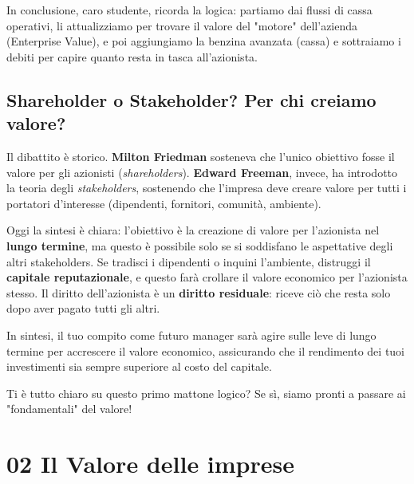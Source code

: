 \documentclass[a4paper,10pt]{article}
\begin{document}
In conclusione, caro studente, ricorda la logica: partiamo dai flussi di cassa operativi, li attualizziamo per trovare il valore del "motore" dell'azienda (Enterprise Value), e poi aggiungiamo la benzina avanzata (cassa) e sottraiamo i debiti per capire quanto resta in tasca all'azionista. 



\subsection*{Shareholder o Stakeholder? Per chi creiamo valore?}

Il dibattito è storico. \textbf{Milton Friedman} sosteneva che l'unico obiettivo fosse il valore per gli azionisti (\textit{shareholders}). \textbf{Edward Freeman}, invece, ha introdotto la teoria degli \textit{stakeholders}, sostenendo che l'impresa deve creare valore per tutti i portatori d'interesse (dipendenti, fornitori, comunità, ambiente).

Oggi la sintesi è chiara: l'obiettivo è la creazione di valore per l'azionista nel \textbf{lungo termine}, ma questo è possibile solo se si soddisfano le aspettative degli altri stakeholders. Se tradisci i dipendenti o inquini l'ambiente, distruggi il \textbf{capitale reputazionale}, e questo farà crollare il valore economico per l'azionista stesso. Il diritto dell'azionista è un \textbf{diritto residuale}: riceve ciò che resta solo dopo aver pagato tutti gli altri.

In sintesi, il tuo compito come futuro manager sarà agire sulle leve di lungo termine per accrescere il valore economico, assicurando che il rendimento dei tuoi investimenti sia sempre superiore al costo del capitale.

Ti è tutto chiaro su questo primo mattone logico? Se sì, siamo pronti a passare ai "fondamentali" del valore!

\section*{02 Il Valore delle imprese}
\end{document}
